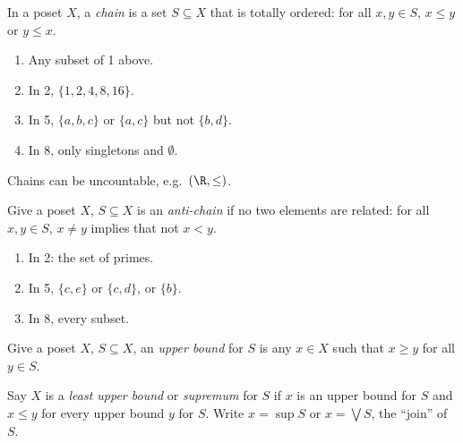 \documentclass[a4paper]{article}
\begin{document}
\begin{definition}[Chain]
  In a poset \(X\), a \emph{chain} is a set \(S \subseteq X\) that is totally ordered: for all \(x, y \in S\), \(x \leq y\) or \(y \leq x\).
\end{definition}

\begin{eg}\leavevmode
  \begin{enumerate}
  \item Any subset of 1 above.
  \item In 2, \(\{1, 2, 4, 8, 16\}\).
  \item In 5, \(\{a, b, c\}\) or \(\{a, c\}\) but not \(\{b, d\}\).
  \item In 8, only singletons and \(\emptyset\).
  \end{enumerate}
\end{eg}

\begin{note}
  Chains can be uncountable, e.g.\ \((\R, \leq)\).
\end{note}

\begin{definition}
  Give a poset \(X\), \(S \subseteq X\) is an \emph{anti-chain} if no two elements are related: for all \(x, y \in S\), \(x \neq y\) implies that not \(x < y\).
\end{definition}

\begin{eg}\leavevmode
  \begin{enumerate}
  \item In 2: the set of primes.
  \item In 5, \(\{c, e\}\) or \(\{c, d\}\), or \(\{b\}\).
  \item In 8, every subset.
  \end{enumerate}
\end{eg}

\begin{definition}
  Give a poset \(X\), \(S \subseteq X\), an \emph{upper bound} for \(S\) is any \(x \in X\) such that \(x \geq y\) for all \(y \in S\).
\end{definition}

\begin{definition}
  Say \(X\) is a \emph{least upper bound} or \emph{supremum} for \(S\) if \(x\) is an upper bound for \(S\) and \(x \leq y\) for every upper bound \(y\) for \(S\). Write \(x = \sup S\) or \(x = \bigvee S\), the ``join'' of \(S\).
\end{definition}
\end{document}
